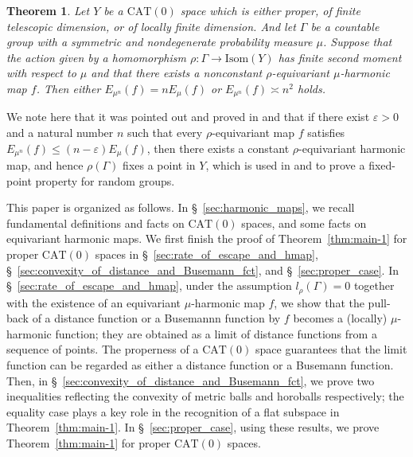 \documentclass[12pt]{amsart}
\numberwithin{equation}{section}
\theoremstyle{plain}
\newtheorem{Main}{Theorem}
\theoremstyle{definition}
\theoremstyle{remark}
\newcommand{\ene}[1]{E_{#1}}
\newcommand{\isom}[1]{\mathrm{Isom}({#1})}
\newcommand{\cat}[1]{\mathrm{CAT}(#1)}
\begin{document}
\begin{Main}
\label{thm:main-5}
 Let $Y$ be a $\cat{0}$ space which is either proper, of
 finite telescopic dimension, or of locally finite dimension.
 And let $\Gamma$ be a countable group with a symmetric and
 nondegenerate probability measure $\mu$.
 Suppose that the action given by a homomorphism 
 $\rho\colon \Gamma \rightarrow \isom{Y}$ has finite second moment with
 respect to $\mu$ and that
 there exists a nonconstant $\rho$-equivariant
 $\mu$-harmonic map $f$. 
 Then either $\ene{\mu^n}(f)=n\ene{\mu}(f)$ or 
 $\ene{\mu^n}(f)\asymp n^2$ holds. 
\end{Main}

We note here that it was pointed out and proved in \cite{gromov} and
\cite{izeki-kondo-nayatani2} that if there exist $\varepsilon>0$ and a
natural number $n$ such that every $\rho$-equivariant map $f$ satisfies
$\ene{\mu^n}(f)\leq (n-\varepsilon)\ene{\mu}(f)$, then there exists a
constant $\rho$-equivariant harmonic map, and hence $\rho(\Gamma)$ fixes
a point in $Y$, which is used in \cite{izeki-kondo-nayatani2} and
\cite{izeki} to prove a fixed-point property for random groups. 

This paper is organized as follows. 
In \S~\ref{sec:harmonic_maps}, we recall fundamental definitions and
facts on $\cat{0}$ spaces, and some facts on equivariant harmonic maps. 
We first finish the proof of Theorem~\ref{thm:main-1} for proper
$\cat{0}$ spaces in \S~\ref{sec:rate_of_escape_and_hmap},
\S~\ref{sec:convexity_of_distance_and_Busemann_fct}, and
\S~\ref{sec:proper_case}. 
In \S~\ref{sec:rate_of_escape_and_hmap}, under the assumption
$l_{\rho}(\Gamma)=0$ together with the existence of an equivariant
$\mu$-harmonic map $f$, we show that the pull-back of a distance
function or a Busemannn function by $f$ becomes a (locally)
$\mu$-harmonic function; they are obtained as a limit of distance
functions from a sequence of points. 
The properness of a $\cat{0}$ space guarantees that the limit
function can be regarded as either a distance function or a Busemann
function. 
Then, in \S~\ref{sec:convexity_of_distance_and_Busemann_fct}, we prove two
inequalities reflecting the convexity of metric balls and horoballs
respectively; the equality case plays a key role in the recognition of a
flat subspace in Theorem~\ref{thm:main-1}. 
In \S~\ref{sec:proper_case}, using these results, we prove
Theorem~\ref{thm:main-1} for proper $\cat{0}$ spaces. 
\end{document}
